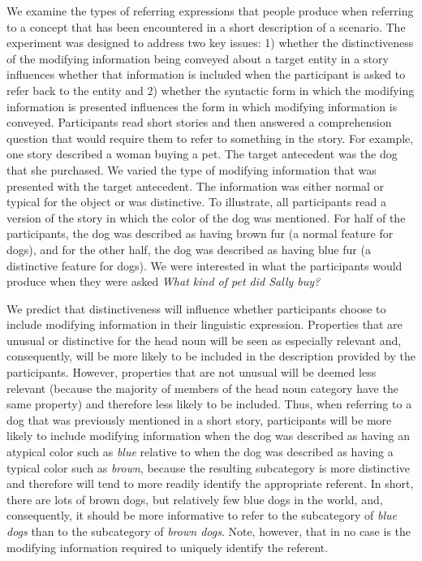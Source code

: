 \documentclass[output=paper]{langsci/langscibook}
\begin{document}
We examine the types of referring expressions that people produce when
referring to a concept that has been encountered in a short
description of a scenario. The experiment was designed to address two
key issues: 1) whether the distinctiveness of the modifying
information being conveyed about a target entity in a story influences
whether that information is included when the participant is asked to
refer back to the entity and 2) whether the syntactic form in which
the modifying information is presented influences the form in which
modifying information is conveyed. Participants read short stories and
then answered a comprehension question that would require them to
refer to something in the story. For example, one story described a
woman buying a pet. The target antecedent was the dog that she
purchased. We varied the type of modifying information that was
presented with the target antecedent. The information was either
normal or typical for the object or was distinctive. To illustrate,
all participants read a version of the story in which the color of the
dog was mentioned. For half of the participants, the dog was described
as having brown fur (a normal feature for dogs), and for the other
half, the dog was described as having blue fur (a distinctive feature
for dogs). We were interested in what the participants would produce
when they were asked \textit{What kind of pet did Sally buy?}

We predict that distinctiveness will influence whether participants
choose to include modifying information in their linguistic
expression. Properties that are unusual or distinctive for the head
noun will be seen as especially relevant and, consequently, will be
more likely to be included in the description provided by the
participants. However, properties that are not unusual will be deemed
less relevant (because the majority of members of the head noun
category have the same property) and therefore less likely to be
included. Thus, when referring to a dog that was previously mentioned
in a short story, participants will be more likely to include
modifying information when the dog was described as having an atypical
color such as \textit{blue} relative to when the dog was described as
having a typical color such as \textit{brown}, because the resulting
subcategory is more distinctive and therefore will tend to more
readily identify the appropriate referent. In short, there are lots of
brown dogs, but relatively few blue dogs in the world, and,
consequently, it should be more informative to refer to the
subcategory of \textit{blue dogs} than to the subcategory of
\textit{brown dogs}. Note, however, that in no case is the modifying
information required to uniquely identify the referent.
\end{document}
